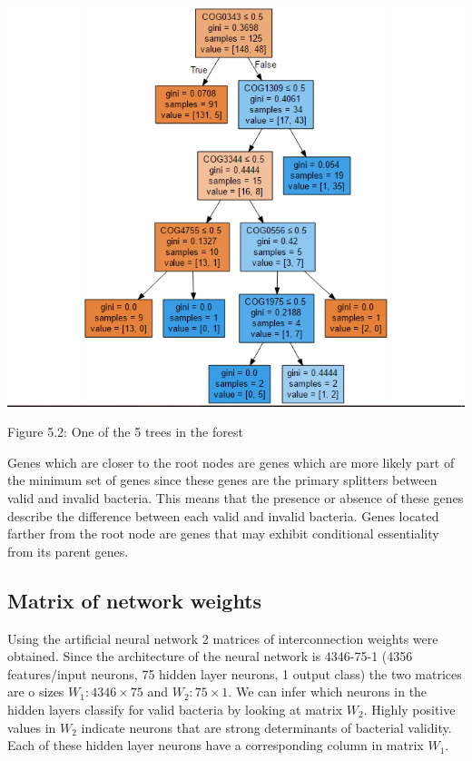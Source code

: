 \documentclass[]{report}
\begin{document}
\includegraphics{images/tree1.PNG}

\begin{center} Figure 5.2: One of the 5 trees in the forest \end{center}

Genes which are closer to the root nodes are genes which are more likely
part of the minimum set of genes since these genes are the primary
splitters between valid and invalid bacteria. This means that the
presence or absence of these genes describe the difference between each
valid and invalid bacteria. Genes located farther from the root node are
genes that may exhibit conditional essentiality from its parent genes.

\subsection{Matrix of network weights}\label{matrix-of-network-weights}

Using the artificial neural network 2 matrices of interconnection
weights were obtained. Since the architecture of the neural network is
4346-75-1 (4356 features/input neurons, 75 hidden layer neurons, 1
output class) the two matrices are o sizes \(W_1:4346 \times 75\) and
\(W_2:75 \times 1\). We can infer which neurons in the hidden layers
classify for valid bacteria by looking at matrix \(W_2\). Highly
positive values in \(W_2\) indicate neurons that are strong determinants
of bacterial validity. Each of these hidden layer neurons have a
corresponding column in matrix \(W_1\).
\end{document}
